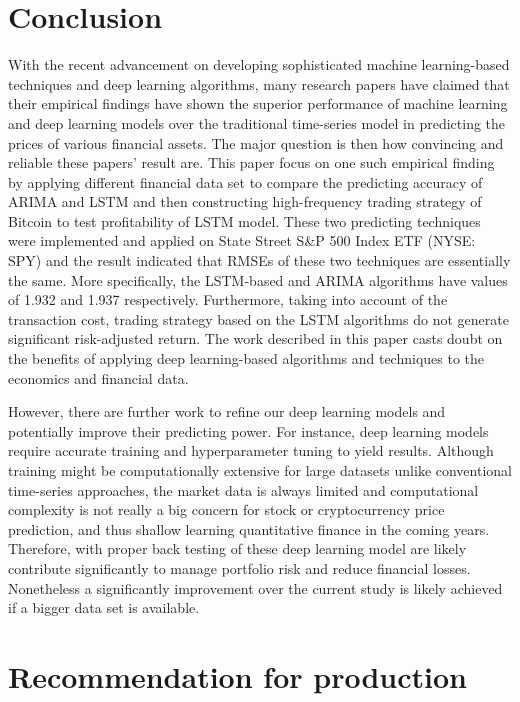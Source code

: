 \documentclass{article}
\begin{document}
\section{Conclusion}
With the recent advancement on developing sophisticated machine learning-based techniques and deep learning algorithms, many research papers have claimed that their empirical findings have shown the superior performance of machine learning and deep learning models over the traditional time-series model in predicting the prices of various financial assets. The major question is then how convincing and reliable these papers' result are. This paper focus on one such empirical finding by applying different financial data set to compare the predicting accuracy of ARIMA and LSTM and then constructing high-frequency trading strategy of Bitcoin to test profitability of LSTM model. These two predicting techniques were implemented and applied on State Street S\&P 500 Index ETF (NYSE: SPY) and the result indicated that RMSEs of these two techniques are essentially the same. More specifically, the LSTM-based and ARIMA  algorithms have values of 1.932 and 1.937 respectively. Furthermore, taking into account of the transaction cost, trading strategy based on the LSTM algorithms do not generate significant risk-adjusted return. The work described in this paper casts doubt on the benefits of applying deep learning-based algorithms and techniques to the economics and financial data. 
 
However, there are further work to refine our deep learning models and potentially improve their predicting power. For instance, deep learning models require accurate training and hyperparameter tuning to yield results. Although training might be computationally extensive for large datasets unlike conventional time-series approaches, the market data is always limited and computational complexity is not really a big concern for stock or cryptocurrency price prediction, and thus shallow learning quantitative finance in the coming years. Therefore, with proper back testing of these deep learning model are likely contribute significantly to manage portfolio risk and reduce financial losses. Nonetheless a significantly improvement over the current study is likely achieved if a bigger data set is available.





\section{Recommendation for production}
\end{document}
